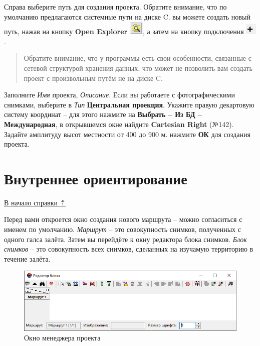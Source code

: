 \documentclass[
  12pt,
]{book}
\begin{document}
Справа выберите путь для создания проекта. Обратите внимание, что по умолчанию предлагаются системные пути на диске C. вы можете создать новый путь, нажав на кнопку \textbf{Open Explorer} \includegraphics{images/Ref15/Open_Explorer.png}, а затем на кнопку подключения \includegraphics{images/Ref15/Connect_Folder.png}.

\begin{quote}
Обратите внимание, что у программы есть свои особенности, связанные с сетевой структурой хранения данных, что может не позволить вам создать проект с произвольным путём не на диске C.
\end{quote}

Заполните \emph{Имя} проекта, \emph{Описание}. Если вы работаете с фотографическими снимками, выберите в \emph{Тип} \textbf{Центральная проекция}. Укажите правую декартовую систему координат -- для этого нажмите на \textbf{Выбрать -- Из БД -- Международная}, в открывшемся окне найдите \textbf{Cartesian Right} (№142). Задайте амплитуду высот местности от 400 до 900 м. нажмите \textbf{ОК} для создания проекта.

\hypertarget{photomod-interior_orientation}{%
\section{Внутреннее ориентирование}\label{photomod-interior_orientation}}

\protect\hyperlink{photomod}{В начало справки ⇡}

Перед вами откроется окно создания нового маршрута -- можно согласиться с именем по умолчанию. \emph{Маршрут} -- это совокупность снимков, полученных с одного галса залёта. Затем вы перейдёте к окну редактора блока снимков. \emph{Блок снимков} -- это совокупность всех снимков, сделанных на изучамую территорию в течение залёта.

\begin{figure}
\centering
\includegraphics{images/Ref15/Block_Editor.png}
\caption{Окно менеджера проекта}
\end{figure}
\end{document}

